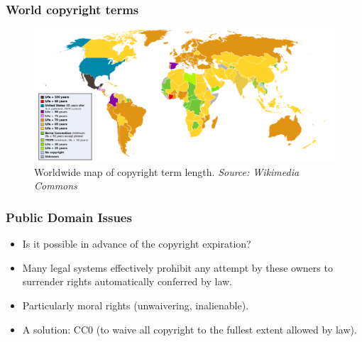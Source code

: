 \documentclass{beamer}
\begin{document}

\begin{frame}
\frametitle{World copyright terms}

\begin{figure}
\vspace{-0.5cm}
	\includegraphics[scale=0.35,clip=true]{figs/World_copyright_terms.png}
	\caption{Worldwide map of copyright term length. \textit{Source: Wikimedia Commons}}
\end{figure}

\end{frame}


\begin{frame}
\frametitle{Public Domain Issues}

\begin{itemize}
\item Is it possible in advance of the copyright expiration?
\pause
\item Many legal systems effectively prohibit any attempt by these owners to surrender rights automatically conferred by law. 
\item Particularly moral rights (unwaivering, inalienable).
\item A solution: CC0 (to waive all copyright to the fullest extent allowed by law).
\end{itemize}

\end{frame}


\end{document}
